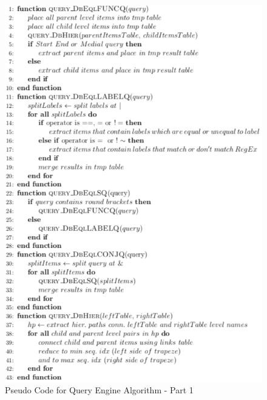 \documentclass[]{book}
\theoremstyle{definition}
\theoremstyle{definition}
\theoremstyle{definition}
\theoremstyle{remark}
\begin{document}
\begin{figure}

{\centering \includegraphics[width=0.9\linewidth]{pics/algorithm1} 

}

\caption{Pseudo Code for Query Engine Algorithm - Part 1}\label{fig:query-implQueryEnginePC-p1}
\end{figure}
\end{document}
